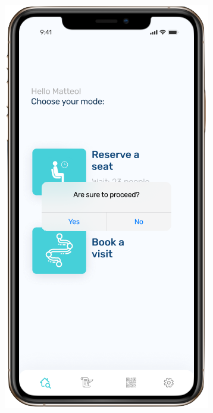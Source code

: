 \begin{figure}[H]
\begin{center}
{            \includegraphics[scale=0.35]{images/mockup/reserve2.png}
        }%
\end{center}
\end{figure}
